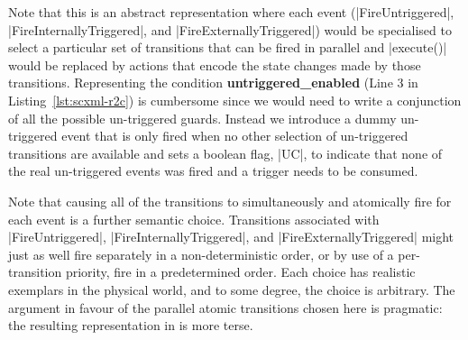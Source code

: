 Note that this is an abstract representation where each event (|FireUntriggered|, |FireInternallyTriggered|, and |FireExternallyTriggered|) would be specialised to select a particular set of transitions that can be fired in parallel and |execute()| would be replaced by actions that encode the state changes made by those transitions.
Representing the condition \textbf{untriggered\_enabled} (Line 3 in Listing~\ref{lst:scxml-r2c}) is cumbersome since we would need to write a conjunction of all the possible un-triggered guards. Instead we introduce a dummy un-triggered event that is only fired when no other selection of un-triggered transitions are available and sets a boolean flag, |UC|, to indicate that none of the real un-triggered events was fired and a trigger needs to be consumed.
 
Note that causing all of the
transitions to simultaneously and atomically fire for each event is a
further semantic choice.  Transitions associated with |FireUntriggered|,
|FireInternallyTriggered|, and |FireExternallyTriggered| might
just as well fire separately in a non-deterministic order, or by use
of a per-transition priority, fire in a predetermined order.  Each
choice has realistic exemplars in the physical world, and to some
degree, the choice is arbitrary.  The argument in favour of the
parallel atomic transitions chosen here is pragmatic: the resulting
representation in \EventB is more terse.

